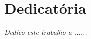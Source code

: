 \chapter*{Dedicatória}


\vfill

\begin{center}
	
	{\sffamily\itshape Dedico este trabalho a ......}
	
\end{center}

\vfill

\newpage